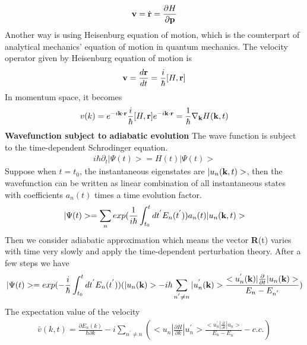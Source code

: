 \documentclass[a4paper]{article}
\begin{document}
\begin{align*}
	{\bf v} = \dot{{\bf r}} = \frac{\partial H}{\partial {\bf p}}
\end{align*}
Another way is using Heisenburg equation of motion, which is the counterpart of analytical mechanics' equation of motion in quantum mechanics. The velocity operator given by Heisenburg equation of motion is
\begin{align*}
	{\bf v} = \frac{d{\bf r}}{dt} = \frac{i}{\hbar}[H, {\bf r}]
\end{align*}
In momentum space, it becomes
\begin{align*}
	v(k) = e^{-i{\bf k} \cdot {\bf r}} \frac{i}{\hbar}[H, {\bf r}] e^{-i{\bf k} \cdot {\bf r}} = \frac{1}{\hbar} \nabla_{\bf k} H({\bf k},t)
\end{align*}
{\bf Wavefunction subject to adiabatic evolution }
The wave function is subject to the time-dependent Schrodinger equation.
\begin{align*}
	i \hbar \partial_t |\Psi(t) > = H(t) |\Psi(t)> 
\end{align*}
Suppose when $t= t_0$, the instantaneous eigenstates are $|u_n({\bf k}, t)>$, then
the wavefunction can be written as linear combination of all instantaneous states with coefficients $a_n(t)$ times a time evolution factor.  
\begin{align*}
	|\Psi(t)> = \sum_n exp(\frac{1}{i\hbar} \int_{t_0}^t dt^{'} E_n(t^{'})) a_n(t) |u_n({\bf k}, t)>
\end{align*}
Then we consider adiabatic approximation which means the vector {\bf R}(t) varies with time very slowly and apply the time-dependent perturbation theory. After a few steps we have
\begin{align*}
	|\Psi(t)>= exp(-\frac{i}{\hbar}\int_{t_0}^{t} dt^{'} E_{n}(t^{'}))(|u_n({\bf k})> 
	-i\hbar \sum_{n^{'}\neq n} |u_n^{'}({\bf k})>\frac{<u_n^{'}({\bf k})|\frac{\partial}{\partial t}|u_n({\bf k})>}{E_{n} - E_{n^{'}}})
\end{align*}
The expectation value of the velocity
\begin{align*}
	\bar v(k,t) = \frac{\partial E_n(k)}{\hbar \partial k} 
	- i \sum_{n^{'}\neq n} (<u_n|\frac{\partial H}{\partial k}|u_n^{'}>\frac{<u_n^{'}|\frac{\partial}{\partial t}|u_n>}{E_{n} - E_{n^{'}}} - c.c.)
\end{align*}
\end{document}
